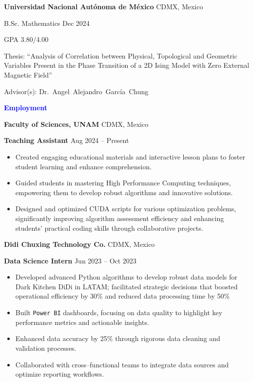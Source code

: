 \documentclass[10pt]{article}
\begin{document}
\textbf{Universidad Nacional Autónoma de México} \hfill CDMX, Mexico

B.Sc. Mathematics  \hfill Dec 2024

GPA 3.80/4.00

Thesis: ``Analysis of Correlation between Physical, Topological and Geometric Variables Present  in the Phase Transition of a 2D Ising Model with Zero External Magnetic Field''

Advisor(s): Dr.\ Angel\ Alejandro\ García\ Chung

\vspace{12pt}
\begin{center}
    \textbf{\textcolor{blue}{Employment}}
\end{center}
\vspace{12pt}
\textbf{Faculty of Sciences, UNAM} \hfill CDMX, Mexico

\textbf{Teaching Assistant} \hfill Aug 2024 – Present
\begin{itemize}[noitemsep, topsep=0pt, partopsep=0pt, parsep=0pt]
    \item Created engaging educational materials and interactive lesson plans to foster student learning and enhance comprehension.
    \item Guided students in mastering High Performance Computing techniques, empowering them to develop robust algorithms and innovative solutions.
    \item Designed and optimized CUDA scripts for various optimization problems, significantly improving algorithm assessment efficiency and enhancing students' practical coding skills through collaborative projects.
\end{itemize}

\vspace{12pt}


\textbf{Didi Chuxing Technology Co.} \hfill CDMX, Mexico

\textbf{Data Science Intern} \hfill Jun 2023 – Oct 2023
\begin{itemize}[noitemsep, topsep=0pt, partopsep=0pt, parsep=0pt]
    \item Developed advanced Python algorithms to develop robust data models for Dark Kitchen DiDi in LATAM; facilitated strategic decisions that boosted operational efficiency by 30\% and reduced data processing time by 50\%
    \item Built \texttt{Power BI} dashboards, focusing on data quality to highlight key performance metrics and actionable insights.
    \item Enhanced data accuracy by 25\% through rigorous data cleaning and validation processes.
    \item Collaborated with cross–functional teams to integrate data sources and optimize reporting workflows.
\end{itemize}
\end{document}
